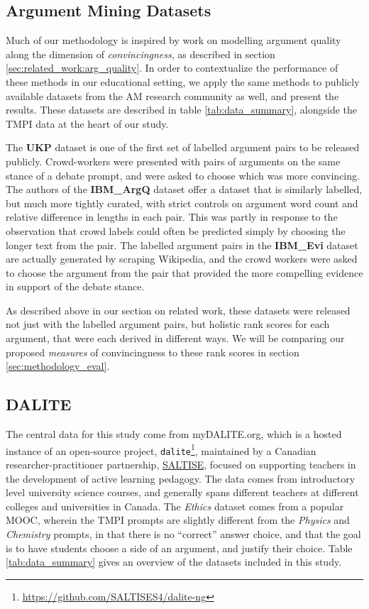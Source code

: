 \documentclass[notitlepage,12pt]{jedm}
\begin{document}
\subsection{Argument Mining Datasets}
Much of our methodology is inspired by work on modelling argument quality along 
the dimension of \textit{convincingness}, as described in section 
\ref{sec:related_work:arg_quality}. 
In order to contextualize the performance of these methods in our educational 
setting, we apply the same methods to publicly available datasets from the 
AM research community as well, and present the results. 
These datasets are described in table \ref{tab:data_summary}, alongside the 
TMPI data at the heart of our study. 

The \textbf{UKP} dataset \cite{habernal_which_2016} is one of the first set of 
labelled argument pairs to be released publicly.
Crowd-workers were presented with pairs of arguments on the same stance of a 
debate prompt, and were asked to choose which was more convincing.
The authors of the \textbf{IBM\_ArgQ} dataset \cite{toledo_automatic_2019} 
offer a dataset that is similarly labelled, but much more tightly curated, with 
strict controls on argument word count and relative difference in lengths in 
each pair.
This was partly in response to the observation that crowd labels could often be 
predicted simply by choosing the longer text from the pair.
The labelled argument pairs in the \textbf{IBM\_Evi} dataset 
\cite{gleize_are_2019} are actually generated by scraping Wikipedia, and the 
crowd workers were asked to choose the argument from the pair that provided the 
more compelling evidence in support of the debate stance.

As described above in our section on related work, these datasets were released 
not just with the labelled argument pairs, but holistic rank scores for each 
argument, that were each derived in different ways. 
We will be comparing our proposed \textit{measures} of convincingness to these 
rank scores in section \ref{sec:methodology_eval}.


\subsection{DALITE}\label{sec:dataset_dalite}
The central data for this study come from myDALITE.org, which is a hosted 
instance of an open-source project, 
\verb|dalite|\footnote{\url{https://github.com/SALTISES4/dalite-ng}}, 
maintained by a Canadian researcher-practitioner partnership, 
\href{saltise.ca}{SALTISE}, focused on supporting teachers in the development 
of active learning pedagogy.
The data comes from introductory level university science courses, and 
generally spans different teachers at different colleges and universities in 
Canada. 
The \textit{Ethics} dataset comes from a popular MOOC, wherein the TMPI prompts 
are slightly different from the \textit{Physics} and \textit{Chemistry} 
prompts, in that there is no ``correct'' answer choice, and that the goal is to 
have students choose a side of an argument, and justify their choice.
Table \ref{tab:data_summary} gives an overview of the datasets included in this 
study.
\end{document}
